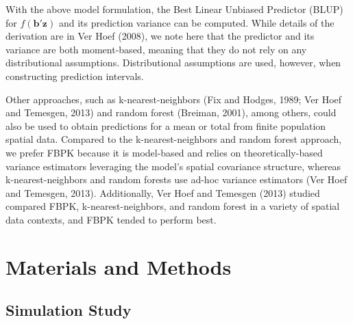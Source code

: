 \documentclass[]{elsarticle} %
\begin{document}
With the above model formulation, the Best Linear Unbiased Predictor
(BLUP) for \(f(\mathbf{b}'\mathbf{z})\) and its prediction variance can
be computed. While details of the derivation are in Ver Hoef (2008), we
note here that the predictor and its variance are both moment-based,
meaning that they do not rely on any distributional assumptions.
Distributional assumptions are used, however, when constructing
prediction intervals.

Other approaches, such as k-nearest-neighbors (Fix and Hodges, 1989; Ver
Hoef and Temesgen, 2013) and random forest (Breiman, 2001), among
others, could also be used to obtain predictions for a mean or total
from finite population spatial data. Compared to the k-nearest-neighbors
and random forest approach, we prefer FBPK because it is model-based and
relies on theoretically-based variance estimators leveraging the model's
spatial covariance structure, whereas k-nearest-neighbors and random
forests use ad-hoc variance estimators (Ver Hoef and Temesgen, 2013).
Additionally, Ver Hoef and Temesgen (2013) studied compared FBPK,
k-nearest-neighbors, and random forest in a variety of spatial data
contexts, and FBPK tended to perform best.

\hypertarget{sec:mm}{%
\section{Materials and Methods}\label{sec:mm}}

\hypertarget{sec:mm_sim}{%
\subsection{Simulation Study}\label{sec:mm_sim}}
\end{document}
